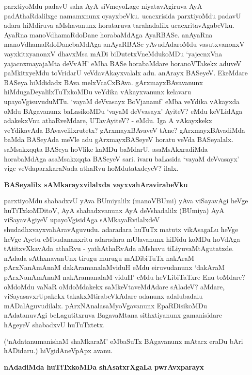 \noindent
parxtiyoMdu padavU saha AyA siVmeyoLage niyatavAgiruva AyA padAthaR\-dalilxge namamxnunx\- oyayxbeVku. ucacxrisida parxtiyoMdu padavU adara hiMdiruva aMshavanunx horataruva tarahadalilx ucacxritavAgabeVku. AyaRna manoVdhamaR\-doDane horabaMdAga AyaRBASe. anAyaRna manoV\-dhamaRdoDane\break baMdAga anAyaRBASe yAvudAdaroMdu vasutxvanonxV vayxkitx\-yanonxV dhavxMsa mADi biDutetxVneMdukoMDu `yajecnxVna yajacnxmayajaMta \hbox{deVvAH}' eMba BASe hora\-baMdare horanoVTakekx aduveV paMkitxyeMdu toVri\-darU veVdavAkayxvalalx adu. anArayx BASeyeV. EkeMdare BASeya hiMdidadx BAva melxVcaCxBAva. gArxmayxBAvavanunx hiMdugaDeyalilxTuTxkoMDu veYdika vAkayxvanunx kela\-varu upayoVgisuvuduMTu. `vayaM deVvasayx BoVjanamf' eMba veYdika vAkayxda oMdu BAga\-vanunx baLasikoMDu `vayaM deVvasayx' AyiteV? eMdu keVLidAga ada\-kekxVnu athaR\-veMdare, UTavAyiteV? - eMdu. Iga A vAkayxkekx veYdikavAda BAvavelilxrutetx? gArxmayxBAvaveV tAne? gArxmayxBA\-vadiMda baMda BASeyAda meVle adu gArxmayxBASeyeV horatu veVda BASeyalalx. saMsakxqqta BASeya hoVlike kaMDu baMdarU, asaMsAkxradiMda horabaMdAga asaMsakxqqta BASeyeV sari. ivaru baLa\-sida `vayaM deVvasayx' vige veVdaparxkaraNada athaRvu hoMdutatxdeyeV? ilalx.

{\bigskip
\noindent
{\large\bf BASeyalilx sAMkarayxvilalxda vayxvahAravirabeVku}}\label{page174}
\medskip

\noindent
parxtiyoMdu shabadxvU yAva BUmiyalilx (manoVBUmi) yAva viSayavAgi heVge\- huTiTx\-koMDitoV, AyA shabadxvanunx AyA deVshadalilx \hbox{(BUmiya)} AyA viSayavAgiyeV upa\-yoV\-gisi\-dAga sAMkayaRvilalxdeV shudadhx\-vayxvahAravAguvudu. adaradara huTuTx matutx vikAsagaLu heVge heVge Ayetu eMbu\-dananxritu adaradara mUlavanunx hiDidu koMDu hoVdAga tAtitxvXkavAda athaRvu - yathA\-thaRvAda aMshavu tiLiyuvaMtAgutatxde. nAdada sAthxnavanUnx tirugu murugu mADibiTuTx nakAraM pArxNanAmAnaM dakAramanalaMviduH eMdu eiruvudanunx `dakAraM pArxNa\-nAmAnaM nakAramanalaM viduH' eMdu heVLi\-biTaTxre Enu toMdare? oMdoMdu vaNaR oMdoM\-dakekx saMkeVtaveMdAdare sAladeV? aMdare, viSayasavxrUpakekx takakxMtirabeVkAdare adanunx adalubadalu mADa\-lAguvudilalx. pArxNAnalasaMyoVgavanunx EpaRDisikoMDu nAdatanuvAgi beLa\-gutitxruva Baga\-vaMtana sithxti\-yanunx gamanisidare hAgeyeV shabadxvU huTuTxtetx.

(`nAdatanumanishaM shaMkaraM' eMbaSuTx BAgavanunx mAtarx eraDu bAri hADidaru.) hiVgidAneVpApx avanu.

{\bigskip
\noindent
{\large\bf nAdadiMda huTiTxkoMDa shAsatxrXgaLa pwrAvxparayx}}
\medskip

